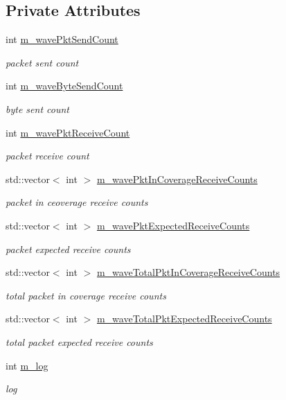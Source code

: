 \subsection*{Private Attributes}
\begin{DoxyCompactItemize}
\item 
int \hyperlink{classns3_1_1WaveBsmStats_a98ab74a0a89a3976158b06b7eaec462f}{m\+\_\+wave\+Pkt\+Send\+Count}
\begin{DoxyCompactList}\small\item\em packet sent count \end{DoxyCompactList}\item 
int \hyperlink{classns3_1_1WaveBsmStats_aea2ae38e556254fdf5f93b97df003f48}{m\+\_\+wave\+Byte\+Send\+Count}
\begin{DoxyCompactList}\small\item\em byte sent count \end{DoxyCompactList}\item 
int \hyperlink{classns3_1_1WaveBsmStats_a8e8c15e7797055950e951ab462d469bc}{m\+\_\+wave\+Pkt\+Receive\+Count}
\begin{DoxyCompactList}\small\item\em packet receive count \end{DoxyCompactList}\item 
std\+::vector$<$ int $>$ \hyperlink{classns3_1_1WaveBsmStats_a96da7d1d05f93bbc60a820ec5818d63d}{m\+\_\+wave\+Pkt\+In\+Coverage\+Receive\+Counts}
\begin{DoxyCompactList}\small\item\em packet in ceoverage receive counts \end{DoxyCompactList}\item 
std\+::vector$<$ int $>$ \hyperlink{classns3_1_1WaveBsmStats_af37262ac6ee054f6f1039587f1460ac6}{m\+\_\+wave\+Pkt\+Expected\+Receive\+Counts}
\begin{DoxyCompactList}\small\item\em packet expected receive counts \end{DoxyCompactList}\item 
std\+::vector$<$ int $>$ \hyperlink{classns3_1_1WaveBsmStats_a2dea853238532bae2f1ea0810848a79e}{m\+\_\+wave\+Total\+Pkt\+In\+Coverage\+Receive\+Counts}
\begin{DoxyCompactList}\small\item\em total packet in coverage receive counts \end{DoxyCompactList}\item 
std\+::vector$<$ int $>$ \hyperlink{classns3_1_1WaveBsmStats_aca9a18f45f441e7682b4005ad5ffd93a}{m\+\_\+wave\+Total\+Pkt\+Expected\+Receive\+Counts}
\begin{DoxyCompactList}\small\item\em total packet expected receive counts \end{DoxyCompactList}\item 
int \hyperlink{classns3_1_1WaveBsmStats_a123e5bc03e378b16b9404508cf381ade}{m\+\_\+log}
\begin{DoxyCompactList}\small\item\em log \end{DoxyCompactList}\end{DoxyCompactItemize}
